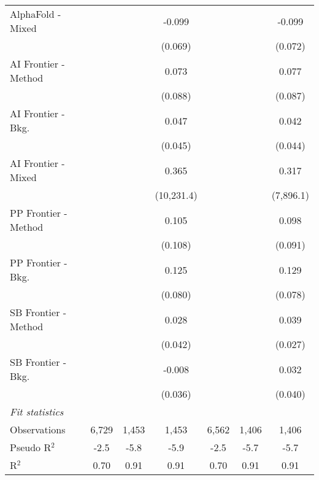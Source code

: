 \begin{tabular}{lcccccc}
   AlphaFold - Mixed    &              &             & -0.099     &              &             & -0.099\\   
                        &              &             & (0.069)    &              &             & (0.072)\\   
   AI Frontier - Method &              &             & 0.073      &              &             & 0.077\\   
                        &              &             & (0.088)    &              &             & (0.087)\\   
   AI Frontier - Bkg.   &              &             & 0.047      &              &             & 0.042\\   
                        &              &             & (0.045)    &              &             & (0.044)\\   
   AI Frontier - Mixed  &              &             & 0.365      &              &             & 0.317\\   
                        &              &             & (10,231.4) &              &             & (7,896.1)\\   
   PP Frontier - Method &              &             & 0.105      &              &             & 0.098\\   
                        &              &             & (0.108)    &              &             & (0.091)\\   
   PP Frontier - Bkg.   &              &             & 0.125      &              &             & 0.129\\   
                        &              &             & (0.080)    &              &             & (0.078)\\   
   SB Frontier - Method &              &             & 0.028      &              &             & 0.039\\   
                        &              &             & (0.042)    &              &             & (0.027)\\   
   SB Frontier - Bkg.   &              &             & -0.008     &              &             & 0.032\\   
                        &              &             & (0.036)    &              &             & (0.040)\\   
   \midrule
   \emph{Fit statistics}\\
   Observations         & 6,729        & 1,453       & 1,453      & 6,562        & 1,406       & 1,406\\  
   Pseudo R$^2$         & -2.5         & -5.8        & -5.9       & -2.5         & -5.7        & -5.7\\  
   R$^2$                & 0.70         & 0.91        & 0.91       & 0.70         & 0.91        & 0.91\\  
   

\end{tabular}
